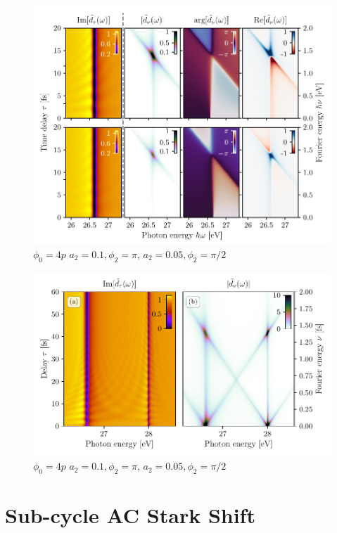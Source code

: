 \begin{figure}
	\centering
	\includegraphics[width=1.0\textwidth]{figures/ATS/DCM_res_high_low.pdf}
	\caption{$\phi_0=4p$ $a_2=0.1,\phi_2=\pi$, $a_2=0.05,\phi_2=\pi/2$}
	\label{fig:res_high_low}
\end{figure}

\begin{figure}
	\centering
	\includegraphics[width=1.0\textwidth]{figures/ATS/multiple_resonances.pdf}
	\caption{$\phi_0=4p$ $a_2=0.1,\phi_2=\pi$, $a_2=0.05,\phi_2=\pi/2$}
	\label{fig:multiple_resonances}
\end{figure}

\section{Sub-cycle AC Stark Shift}
\label{sec:ac_stark}

